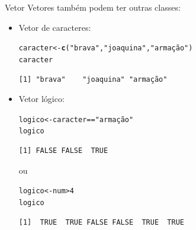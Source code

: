 \documentclass[10pt,handout]{beamer}\usepackage[]{graphicx}\usepackage[]{color}
\makeatletter
\newcommand{\hlnum}[1]{\textcolor[rgb]{0.686,0.059,0.569}{#1}}%
\newcommand{\hlstr}[1]{\textcolor[rgb]{0.192,0.494,0.8}{#1}}%
\newcommand{\hlopt}[1]{\textcolor[rgb]{0,0,0}{#1}}%
\newcommand{\hlstd}[1]{\textcolor[rgb]{0.345,0.345,0.345}{#1}}%
\newcommand{\hlkwb}[1]{\textcolor[rgb]{0.69,0.353,0.396}{#1}}%
\newcommand{\hlkwd}[1]{\textcolor[rgb]{0.737,0.353,0.396}{\textbf{#1}}}%
\newenvironment{kframe}{%
 \def\at@end@of@kframe{}%
 \ifinner\ifhmode%
  \def\at@end@of@kframe{\end{minipage}}%
  \begin{minipage}{\columnwidth}%
 \fi\fi%
 \def\FrameCommand##1{\hskip\@totalleftmargin \hskip-\fboxsep
 \colorbox{shadecolor}{##1}\hskip-\fboxsep
     \hskip-\linewidth \hskip-\@totalleftmargin \hskip\columnwidth}%
 \MakeFramed {\advance\hsize-\width
   \@totalleftmargin\z@ \linewidth\hsize
   \@setminipage}}%
 {\par\unskip\endMakeFramed%
 \at@end@of@kframe}
\newenvironment{knitrout}{}{} %
\makeatother
\begin{document}
\begin{frame}[fragile]{Vetor}
Vetores também podem ter outras classes:
\begin{itemize}
\item Vetor de caracteres:
\begin{knitrout}\small
{}\color{fgcolor}\begin{kframe}
\begin{alltt}
\hlstd{caracter} \hlkwb{<-} \hlkwd{c}\hlstd{(}\hlstr{"brava"}\hlstd{,} \hlstr{"joaquina"}\hlstd{,} \hlstr{"armação"}\hlstd{)}
\hlstd{caracter}
\end{alltt}
\begin{verbatim}
[1] "brava"    "joaquina" "armação" 
\end{verbatim}
\end{kframe}
\end{knitrout}
\item Vetor lógico:
\begin{knitrout}\small
{}\color{fgcolor}\begin{kframe}
\begin{alltt}
\hlstd{logico} \hlkwb{<-} \hlstd{caracter} \hlopt{==} \hlstr{"armação"}
\hlstd{logico}
\end{alltt}
\begin{verbatim}
[1] FALSE FALSE  TRUE
\end{verbatim}
\end{kframe}
\end{knitrout}
ou
\begin{knitrout}\small
{}\color{fgcolor}\begin{kframe}
\begin{alltt}
\hlstd{logico} \hlkwb{<-} \hlstd{num} \hlopt{>} \hlnum{4}
\hlstd{logico}
\end{alltt}
\begin{verbatim}
[1]  TRUE  TRUE FALSE FALSE  TRUE  TRUE
\end{verbatim}
\end{kframe}
\end{knitrout}
\end{itemize}
\end{frame}
\end{document}

